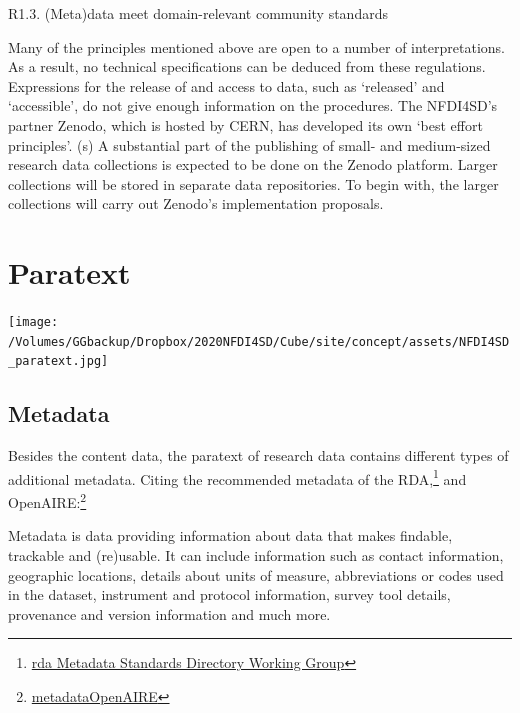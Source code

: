 \documentclass[
  english,
  paper=a4,
  oneside,captions=tableheading
]{scrbook}
\renewenvironment{quote}{\begin{customblockquote}\list{}{\rightmargin=0em\leftmargin=0em}%
\item\relax\color{blockquote-text}\ignorespaces}{\unskip\unskip\endlist\end{customblockquote}}
\begin{document}
\begin{quote}
R1.3. (Meta)data meet domain-relevant community standards
\end{quote}

Many of the principles mentioned above are open to a number of
interpretations. As a result, no technical specifications can be deduced
from these regulations. Expressions for the release of and access to
data, such as `released' and `accessible', do not give enough
information on the procedures. The NFDI4SD's partner Zenodo, which is
hosted by CERN, has developed its own `best effort principles'. (s) A
substantial part of the publishing of small- and medium-sized research
data collections is expected to be done on the Zenodo platform. Larger
collections will be stored in separate data repositories. To begin with,
the larger collections will carry out Zenodo's implementation proposals.

\hypertarget{paratext}{%
\section{Paratext}\label{paratext}}

\texttt{[image: /Volumes/GGbackup/Dropbox/2020NFDI4SD/Cube/site/concept/assets/NFDI4SD\_paratext.jpg]}

\hypertarget{metadata}{%
\subsection{Metadata}\label{metadata}}

Besides the content data, the paratext of research data contains
different types of additional metadata. Citing the recommended metadata
of the RDA,\footnote{\href{http://rd-alliance.github.io/metadata-directory/}{rda
  Metadata Standards Directory Working Group}} and OpenAIRE:\footnote{\href{https://www.openaire.eu/what-is-metadata\#:~:text=Some\%20specific\%20examples\%20of\%20metadata,economic\%20sciences\%2C\%20including\%20survey\%20data}{metadataOpenAIRE}}

\begin{quote}
Metadata is data providing information about data that makes findable,
trackable and (re)usable. It can include information such as contact
information, geographic locations, details about units of measure,
abbreviations or codes used in the dataset, instrument and protocol
information, survey tool details, provenance and version information and
much more.
\end{quote}
\end{document}
